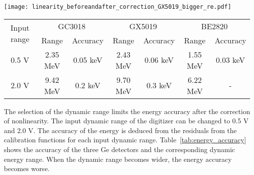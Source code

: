 \begin{figure*}
  \centering
  \texttt{[image: linearity\_beforeandafter\_correction\_GX5019\_bigger\_re.pdf]}
  \caption{Residuals from the linear calibration function for (a) the digitizer (V1730B with a 2.0-V range), (b) the preamplifier of GX5019, (c) the Ge crystal of GX5019, and (d) after nonlinearity correction~\cite{Mizuno2023-px}.}
  \label{fig:linearity}
\end{figure*}



\begin{table*}[width=.75\textwidth, cols=4,pos=h]
\centering
\caption{Energy accuracy after nonlinearity correction for the three Ge detectors.
        The input dynamic range of the waveform digitizer can be selected at 0.5 and 2.0 V and the corresponding energy ranges for each detector are listed in the table.
        The result of BE2820 is only for the 0.5-V range because BE2820 is only used in low-energy regions below 2 MeV.
        The gain of the detectors is set to the maximum ($\times 10$) and the DC offset is fixed at 10\% (see Sect.~\ref{sec:Eresolution}).}
\label{tab:energy_accuracy}
\begin{tabular*}{\tblwidth}{@{}c cc cc cc@{}}
    \toprule
    \multirow{2}{*}{Input range} & \multicolumn{2}{c}{GC3018} & \multicolumn{2}{c}{GX5019} & \multicolumn{2}{c}{BE2820} \\
                & Range & Accuracy & Range & Accuracy & Range & Accuracy \\
    \midrule
    0.5 V & 2.35 MeV & 0.05 keV & 2.43 MeV & 0.06 keV & 1.55 MeV & 0.03 keV\\
    2.0 V & 9.42 MeV & 0.2  keV & 9.70 MeV & 0.3  keV & 6.22 MeV & -    \\
    \bottomrule
\end{tabular*}
\end{table*}


The selection of the dynamic range limits the energy accuracy after the correction of nonlinearity.
The input dynamic range of the digitizer can be changed to 0.5 V and 2.0 V.
The accuracy of the energy is deduced from the residuals from the calibration functions for each input dynamic range.
Table~\ref{tab:energy_accuracy} shows the accuracy of the three Ge detectors and the corresponding dynamic energy range. 
When the dynamic range becomes wider, the energy accuracy becomes worse. 



